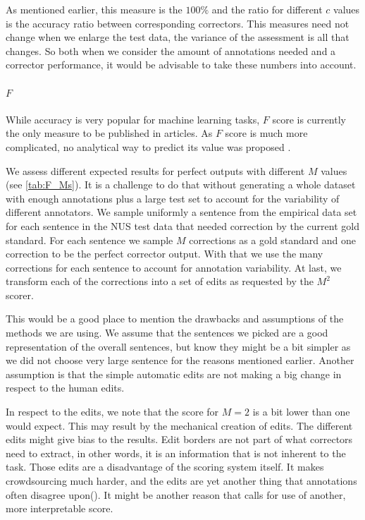 \documentclass[english]{article}
\begin{document}
  As mentioned earlier, this measure is the $100\%$ and the ratio for different $c$ values is the accuracy ratio between corresponding correctors. This measures need not change when we enlarge the test data, the variance of the assessment is all that changes. So both when we consider the amount of annotations needed and a corrector performance, it would be advisable to take these numbers into account.

\paragraph{$F$} While accuracy is very popular for machine learning tasks, $F$ score is currently the only measure to be published in articles. As $F$ score is much more complicated, no analytical way to predict its value was proposed \cite{yeh2000more}. 

We assess different expected results for perfect outputs with different $M$ values (see \ref{tab:F_Ms}). It is a challenge to do that without generating a whole dataset with enough annotations plus a large test set to account for the variability of different annotators. We sample uniformly a sentence from the empirical data set for each sentence in the NUS test data that needed correction by the current gold standard. For each sentence we sample $M$ corrections as a gold standard and one correction to be the perfect corrector output. With that we use the many corrections for each sentence to account for annotation variability. At last, we transform each of the corrections into a set of edits as requested by the $M^2$ scorer\cite{dahlmeier2012better}.  

This would be a good place to mention the drawbacks and assumptions of the methods we are using. We assume that the sentences we picked are a good representation of the overall sentences, but know they might be a bit simpler as we did not choose very large sentence for the reasons mentioned earlier. Another assumption is that the simple automatic edits are not making a big change in respect to the human edits.

In respect to the edits, we note that the score for $M=2$ is a bit lower than one would expect. This may result by the mechanical creation of edits. The different edits might give bias to the results. Edit borders are not part of what correctors need to extract, in other words, it is an information that is not inherent to the task. Those edits are a disadvantage of the scoring system itself. It makes crowdsourcing much harder, and the edits are yet another thing that annotations often disagree upon(\cite{dahlmeier2012better}). It might be another reason that calls for use of another, more interpretable score.
\end{document}
